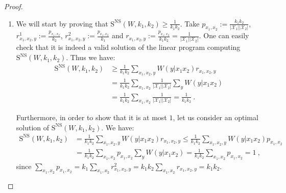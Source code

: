 \begin{proof}
  \begin{enumerate}
  \item We will start by proving that $\mathrm{S}^{\mathrm{NS}}(W,k_1,k_2) \geq \frac{1}{k_1k_2}$. Take $p_{x_1,x_2} := \frac{k_1k_2}{|\mathcal{X}_1||\mathcal{X}_2|}$, $r^1_{x_1,x_2,y} := \frac{p_{x_1,x_2}}{k_2}$, $r^2_{x_1,x_2,y} := \frac{p_{x_1,x_2}}{k_1}$ and $r_{x_1,x_2,y} := \frac{p_{x_1,x_2}}{k_1k_2} = \frac{1}{|\mathcal{X}_1||\mathcal{X}_2|}$. One can easily check that it is indeed a valid solution of the linear program computing $\mathrm{S}^{\mathrm{NS}}(W,k_1,k_2)$. Thus we have:
    \begin{equation}
      \begin{aligned}
        \mathrm{S}^{\mathrm{NS}}(W,k_1,k_2) &\geq \frac{1}{k_1k_2} \sum_{x_1,x_2,y} W(y|x_1x_2)r_{x_1,x_2,y}\\
        &= \frac{1}{k_1k_2} \sum_{x_1,x_2} \frac{1}{|\mathcal{X}_1||\mathcal{X}_2|} \sum_y W(y|x_1x_2)\\
        &= \frac{1}{k_1k_2} \sum_{x_1,x_2} \frac{1}{|\mathcal{X}_1||\mathcal{X}_2|} = \frac{1}{k_1k_2} \ .
      \end{aligned}
    \end{equation}

    Furthermore, in order to show that it is at most $1$, let us consider an optimal solution of $\mathrm{S}^{\mathrm{NS}}(W,k_1,k_2)$. We have:
    \begin{equation}
      \begin{aligned}
        \mathrm{S}^{\mathrm{NS}}(W,k_1,k_2) &= \frac{1}{k_1k_2} \sum_{x_1,x_2,y} W(y|x_1x_2)r_{x_1,x_2,y} \leq \frac{1}{k_1k_2} \sum_{x_1,x_2,y} W(y|x_1x_2)p_{x_1,x_2}\\
        &= \frac{1}{k_1k_2} \sum_{x_1,x_2} p_{x_1,x_2} \sum_y W(y|x_1x_2) = \frac{1}{k_1k_2} \sum_{x_1,x_2} p_{x_1,x_2} = 1 \ ,
      \end{aligned}
    \end{equation}
    since $\sum_{x_1,x_2} p_{x_1,x_2} = k_1 \sum_{x_1,x_2} r^2_{x_1,x_2,y} = k_1k_2 \sum_{x_1,x_2} r_{x_1,x_2,y} =k_1k_2$.
    

\end{enumerate}
\end{proof}
